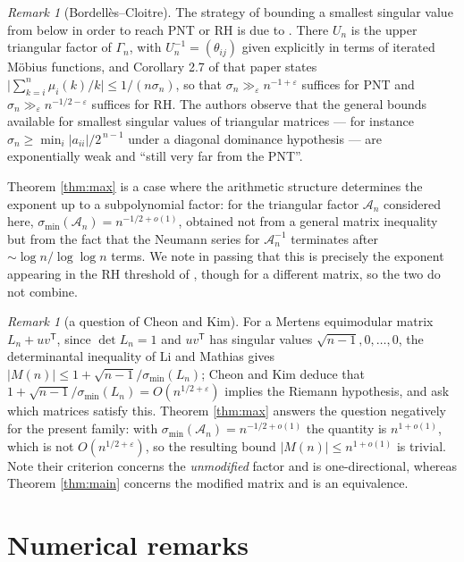 \documentclass[11pt]{article}
\theoremstyle{definition}
\theoremstyle{remark}
\newtheorem{remark}[theorem]{Remark}
\newcommand{\Ac}{\mathcal{A}}
\begin{document}
\begin{remark}[Bordell\`es--Cloitre]\label{rem:bc}
The strategy of bounding a smallest singular value from below in order to reach
PNT or RH is due to \cite{bordellescloitre}. There $U_n$ is the upper triangular
factor of $\Gamma_n$, with $U_n^{-1}=(\theta_{ij})$ given explicitly in terms of
iterated M\"obius functions, and Corollary 2.7 of that paper states
$\bigl|\sum_{k=i}^n \mu_i(k)/k\bigr|\le 1/(n\sigma_n)$, so that
$\sigma_n\gg_\varepsilon n^{-1+\varepsilon}$ suffices for PNT and
$\sigma_n\gg_\varepsilon n^{-1/2-\varepsilon}$ suffices for RH. The authors
observe that the general bounds available for smallest singular values of
triangular matrices --- for instance $\sigma_n\ge\min_i|a_{ii}|/2^{\,n-1}$ under a
diagonal dominance hypothesis --- are exponentially weak and ``still very far from
the PNT''.

Theorem \ref{thm:max} is a case where the arithmetic structure determines the
exponent up to a subpolynomial factor: for the triangular factor $\Ac_n$
considered here, $\sigma_{\min}(\Ac_n)=n^{-1/2+o(1)}$, obtained not from a general matrix
inequality but from the fact that the Neumann series for $\Ac_n^{-1}$ terminates
after $\sim\log n/\log\log n$ terms. We note in passing that this is precisely
the exponent appearing in the RH threshold of \cite{bordellescloitre}, though for
a different matrix, so the two do not combine.
\end{remark}

\begin{remark}[a question of Cheon and Kim]\label{rem:cheonkim}
For a Mertens equimodular matrix $L_n+uv^{\mathsf T}$, since $\det L_n=1$ and
$uv^{\mathsf T}$ has singular values $\sqrt{n-1},0,\dots,0$, the determinantal
inequality of Li and Mathias \cite{limathias} gives $|M(n)|\le
1+\sqrt{n-1}/\sigma_{\min}(L_n)$; Cheon and Kim \cite[Thm.~4.2]{cheonkim} deduce
that $1+\sqrt{n-1}/\sigma_{\min}(L_n)=O(n^{1/2+\varepsilon})$ implies the Riemann
hypothesis, and ask which matrices satisfy this. Theorem \ref{thm:max} answers the
question negatively for the present family: with
$\sigma_{\min}(\Ac_n)=n^{-1/2+o(1)}$ the quantity is $n^{1+o(1)}$, which is not
$O(n^{1/2+\varepsilon})$, so the resulting bound $|M(n)|\le n^{1+o(1)}$ is trivial. Note their criterion concerns the
\emph{unmodified} factor and is one-directional, whereas Theorem \ref{thm:main}
concerns the modified matrix and is an equivalence.
\end{remark}

\section{Numerical remarks}\label{sec:numerics}
\end{document}
